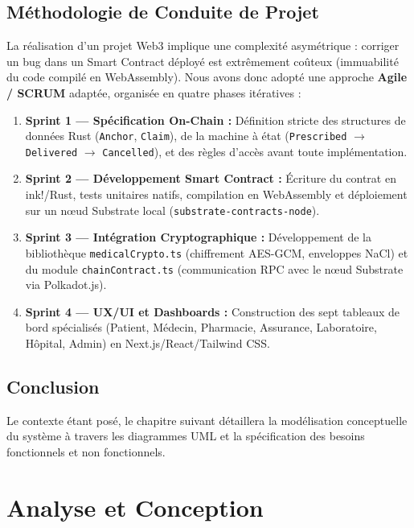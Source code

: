 \documentclass[12pt,a4paper]{report}
\begin{document}
\section{Méthodologie de Conduite de Projet}
La réalisation d'un projet Web3 implique une complexité asymétrique : corriger un bug dans un Smart Contract déployé est extrêmement coûteux (immuabilité du code compilé en WebAssembly). Nous avons donc adopté une approche \textbf{Agile / SCRUM} adaptée, organisée en quatre phases itératives :

\begin{enumerate}
    \item \textbf{Sprint 1 — Spécification On-Chain :} Définition stricte des structures de données Rust (\texttt{Anchor}, \texttt{Claim}), de la machine à état (\texttt{Prescribed} $\rightarrow$ \texttt{Delivered} $\rightarrow$ \texttt{Cancelled}), et des règles d'accès avant toute implémentation.
    \item \textbf{Sprint 2 — Développement Smart Contract :} Écriture du contrat en ink!/Rust, tests unitaires natifs, compilation en WebAssembly et déploiement sur un nœud Substrate local (\texttt{substrate-contracts-node}).
    \item \textbf{Sprint 3 — Intégration Cryptographique :} Développement de la bibliothèque \texttt{medicalCrypto.ts} (chiffrement AES-GCM, enveloppes NaCl) et du module \texttt{chainContract.ts} (communication RPC avec le nœud Substrate via Polkadot.js).
    \item \textbf{Sprint 4 — UX/UI et Dashboards :} Construction des sept tableaux de bord spécialisés (Patient, Médecin, Pharmacie, Assurance, Laboratoire, Hôpital, Admin) en Next.js/React/Tailwind CSS.
\end{enumerate}

\section{Conclusion}
Le contexte étant posé, le chapitre suivant détaillera la modélisation conceptuelle du système à travers les diagrammes UML et la spécification des besoins fonctionnels et non fonctionnels.

\chapter{Analyse et Conception}
\end{document}
